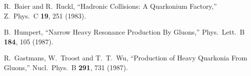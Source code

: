 \documentclass[aps,prc,preprint,superscriptaddress,showpacs,showkeys,amsmath]{revtex4-1}
\begin{document}
\begin{thebibliography}{100}







  








%
  R.~Baier and R.~Ruckl,
  ``Hadronic Collisions: A Quarkonium Factory,''
  Z.\ Phys.\ C {\bf 19}, 251 (1983).


  B.~Humpert,
  ``Narrow Heavy Resonance Production By Gluons,''
  Phys.\ Lett.\ B {\bf 184}, 105 (1987).



  R.~Gastmans, W.~Troost and T.~T.~Wu,
  ``Production of Heavy Quarkonia From Gluons,''
  Nucl.\ Phys.\ B {\bf 291}, 731 (1987).




\end{thebibliography}
\end{document}
